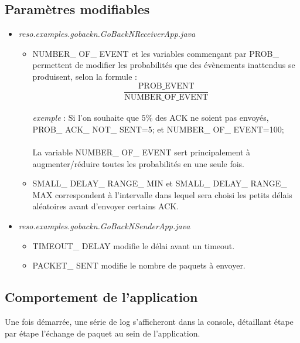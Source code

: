 \documentclass[]{article}
\begin{document}
\subsection{Paramètres modifiables}
\begin{itemize}
\item \emph{reso.examples.gobackn.GoBackNReceiverApp.java}\\
\begin{itemize}
\item NUMBER\_ OF\_ EVENT et les variables commençant par PROB\_ permettent de modifier les probabilités que des évènements inattendus se produisent, selon la formule : \[\frac{\text{PROB\_ EVENT}}{\text{NUMBER\_ OF\_ EVENT}}\]\\
\emph{exemple} : Si l'on souhaite que $5\%$ des ACK ne soient pas envoyés,\\ PROB\_ ACK\_ NOT\_ SENT=5; et NUMBER\_ OF\_ EVENT=100;\\\\
La variable NUMBER\_ OF\_ EVENT sert principalement à augmenter/réduire toutes les probabilités en une seule fois.
\item SMALL\_ DELAY\_ RANGE\_ MIN et SMALL\_ DELAY\_ RANGE\_ MAX correspondent à l'intervalle dans lequel sera choisi les petits délais aléatoires avant d'envoyer certains ACK.\\
\end{itemize}
\item \emph{reso.examples.gobackn.GoBackNSenderApp.java}\\
\begin{itemize}
\item TIMEOUT\_ DELAY modifie le délai avant un timeout.
\item PACKET\_ SENT modifie le nombre de paquets à envoyer.
\end{itemize}
\end{itemize}
\subsection{Comportement de l'application}
Une fois démarrée, une série de log s'afficheront dans la console, détaillant étape par étape l'échange de paquet au sein de l'application.
\end{document}

